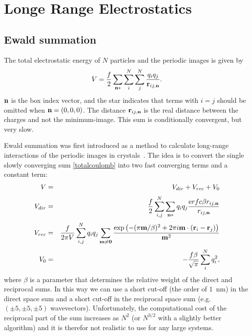 \section{Longe Range Electrostatics}
\subsection{Ewald summation}
\label{sec:ewald}
The total electrostatic energy of $N$ particles and the periodic
images is given by
\begin{equation}
V=\frac{f}{2}\sum_{{\bf n}*} \sum_{i}^{N} \sum_{j}^{N} \frac{q_i
  q_j}{{\bf r}_{ij,{\bf n}}}.
\label{totalcoulomb}
\end{equation}
${\bf n}$ is the box index vector, and the star indicates that
terms with $i=j$ should be omitted when ${\bf n}=(0,0,0)$. The
distance ${\bf r}_{ij,{\bf n}}$ is the real distance between the charges and
not the minimum-image. This sum is conditionally convergent, but 
very slow.

Ewald summation was first introduced as a method to calculate
long-range interactions of the periodic images in
crystals~\cite{Ewald21}. The idea is to convert the single slowly converging
sum \ref{totalcoulomb} into two fast converging terms and a constant
term:
\begin{eqnarray}
V &=& V_{dir} + V_{rec} + V_{0} \\[0.5ex]
V_{dir} &=& \frac{f}{2} \sum_{i,j}^{N} 
\sum_{{\bf n}*} q_i q_j \frac{{\mbox erfc}{\beta {r}_{ij,{\bf n}} }}{{r}_{ij,{\bf n}}} \\[0.5ex]
V_{rec} &=& \frac{f}{2 \pi V} \sum_{i,j}^{N} q_i q_j 
\sum_{\bf m\neq0} \frac{\exp{\left( -(\pi {\bf m}/\beta)^2 + 2 \pi i
      {\bf m} \cdot ({\bf r}_i - {\bf r}_j)\right)}}{{\bf m}^2} \\[0.5ex]
V_{0} &=& -\frac{f \beta}{\sqrt{\pi}}\sum_{i}^{N} q_i^2,
\end{eqnarray}
where $\beta$ is a parameter that determines the relative weight of the
direct and reciprocal sums.
In this way we can use a short cut-off (the order of $1$~nm) in the direct space sum and a
short cut-off in the reciprocal space sum (e.g. $(\pm 5,\pm 5,\pm 5)$
wavevectors). Unfortunately, the computational cost of the reciprocal
part of the sum increases as $N^2$
(or $N^{3/2}$ with a slightly better algorithm) and it is therefor not 
realistic to use for any large systems.

